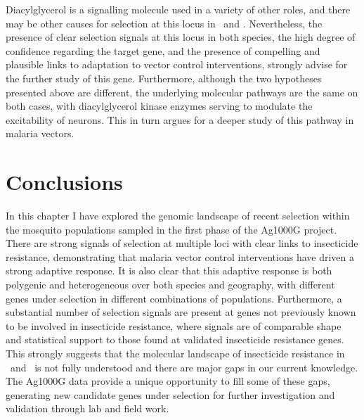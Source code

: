 \documentclass[a4paper,11pt,abstracton,hidelinks]{scrartcl}
\begin{document}
Diacylglycerol is a signalling molecule used in a variety of other roles, and there may be other causes for selection at this locus in \agam\ and \acol.
%
Nevertheless, the presence of clear selection signals at this locus in both species, the high degree of confidence regarding the target gene, and the presence of compelling and plausible links to adaptation to vector control interventions, strongly advise for the further study of this gene.
%
Furthermore, although the two hypotheses presented above are different, the underlying molecular pathways are the same on both cases, with diacylglycerol kinase enzymes serving to modulate the excitability of neurons.
%
This in turn argues for a deeper study of this pathway in malaria vectors.


\section{Conclusions}\label{sec:conclusions}


In this chapter I have explored the genomic landscape of recent selection within the mosquito populations sampled in the first phase of the Ag1000G project.
%
There are strong signals of selection at multiple loci with clear links to insecticide resistance, demonstrating that malaria vector control interventions have driven a strong adaptive response.
%
It is also clear that this adaptive response is both polygenic and heterogeneous over both species and geography, with different genes under selection in different combinations of populations.
%
Furthermore, a substantial number of selection signals are present at genes not previously known to be involved in insecticide resistance, where signals are of comparable shape and statistical support to those found at validated insecticide resistance genes.
%
This strongly suggests that the molecular landscape of insecticide resistance in \agam\ and \acol\ is not fully understood and there are major gaps in our current knowledge.
%
The Ag1000G data provide a unique opportunity to fill some of these gaps, generating new candidate genes under selection for further investigation and validation through lab and field work.


\end{document}
